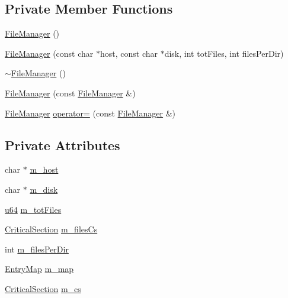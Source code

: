 \subsection*{Private Member Functions}
\begin{DoxyCompactItemize}
\item 
\hyperlink{classmsfs_1_1_file_manager_af71f3f5539a88cd85c44ecc477754bdf}{File\+Manager} ()
\item 
\hyperlink{classmsfs_1_1_file_manager_a7af2ac4dd2216a5c09ff48fc495c5ad1}{File\+Manager} (const char $\ast$host, const char $\ast$disk, int tot\+Files, int files\+Per\+Dir)
\item 
\hyperlink{classmsfs_1_1_file_manager_a5ffab97358f38c103935554a24a8af1b}{$\sim$\+File\+Manager} ()
\item 
\hyperlink{classmsfs_1_1_file_manager_a9b5172d615b1dfd3948e0fa612d336fe}{File\+Manager} (const \hyperlink{classmsfs_1_1_file_manager}{File\+Manager} \&)
\item 
\hyperlink{classmsfs_1_1_file_manager}{File\+Manager} \hyperlink{classmsfs_1_1_file_manager_ace7d6749384579633164fdb8f4b479fd}{operator=} (const \hyperlink{classmsfs_1_1_file_manager}{File\+Manager} \&)
\end{DoxyCompactItemize}
\subsection*{Private Attributes}
\begin{DoxyCompactItemize}
\item 
char $\ast$ \hyperlink{classmsfs_1_1_file_manager_a00dd6d302cdaae608649666aace89964}{m\+\_\+host}
\item 
char $\ast$ \hyperlink{classmsfs_1_1_file_manager_abf76498ababce7cf7f9c79734387b5e5}{m\+\_\+disk}
\item 
\hyperlink{_portable_8h_ad758b7a5c3f18ed79d2fcd23d9f16357}{u64} \hyperlink{classmsfs_1_1_file_manager_a15069dab9b5a271b2577e287fc4e3487}{m\+\_\+tot\+Files}
\item 
\hyperlink{classmsfs_1_1_critical_section}{Critical\+Section} \hyperlink{classmsfs_1_1_file_manager_a6bec4a07b367b1d75c517a30e517fcd6}{m\+\_\+files\+Cs}
\item 
int \hyperlink{classmsfs_1_1_file_manager_a16a6bec0eb9a3ea5fa6298b5c8541b33}{m\+\_\+files\+Per\+Dir}
\item 
\hyperlink{classmsfs_1_1_file_manager_a645a98d3bf6d0dafa69369db633f7f7f}{Entry\+Map} \hyperlink{classmsfs_1_1_file_manager_ad0fc7a5fdeb2def16f0d6bcb6e12a7e3}{m\+\_\+map}
\item 
\hyperlink{classmsfs_1_1_critical_section}{Critical\+Section} \hyperlink{classmsfs_1_1_file_manager_acd847a59540982f996ee4c678b062c1f}{m\+\_\+cs}
\end{DoxyCompactItemize}
